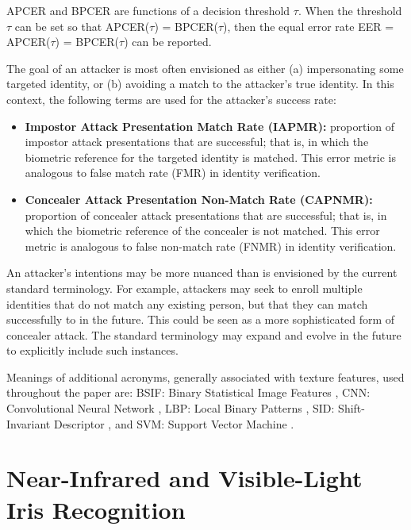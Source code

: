 \documentclass[format=acmsmall, review=false, timestamp=false]{acmart}
\begin{document}
{APCER and BPCER are functions of a decision threshold $\tau$.} When the threshold $\tau$ can be set so that APCER($\tau$) = BPCER($\tau$), then the equal error rate {EER = APCER($\tau$) = BPCER($\tau$) can be reported.}

The goal of an attacker is most often envisioned as either (a) impersonating some targeted identity, or (b) avoiding a match to the attacker's true identity. In this context, the following terms are used for the attacker's success rate:
%
\begin{itemize} 
\item {\bf Impostor Attack Presentation Match Rate (IAPMR):} proportion of impostor attack presentations that are successful; that is, in which the biometric reference for the targeted identity is matched. This error metric is analogous to false match rate (FMR) in identity verification.
%
\item {\bf Concealer Attack Presentation Non-Match Rate (CAPNMR):} proportion of concealer attack presentations that are successful; that is, in which the biometric reference of the concealer is not matched. This error metric is analogous to false non-match rate (FNMR) in identity verification.
\end{itemize}

{A}n attacker's intentions may be more nuanced than is envisioned by the current standard terminology. For example, {attackers} may seek to enroll multiple identities that do not match any existing person, but that they can match successfully to in the future. This could be seen as a more sophisticated form of concealer attack. The standard terminology may expand and evolve in the future to explicitly include such instances.

Meanings of additional acronyms, generally associated with texture features, used throughout the paper are:
BSIF: Binary Statistical Image Features \cite{Kannala_ICPR_2012},
CNN: Convolutional Neural Network \cite{Lecun_ProcIEEE_1998},
LBP: Local Binary Patterns \cite{Ojala_ICPR_1994},
SID: Shift-Invariant Descriptor \cite{Kokkinos_CVPR_2008}, and
SVM: Support Vector Machine \cite{Boser_CLT_1992}.




\section{Near-Infrared and Visible-Light Iris Recognition}
\label{sec:Near_infrared}
\end{document}
